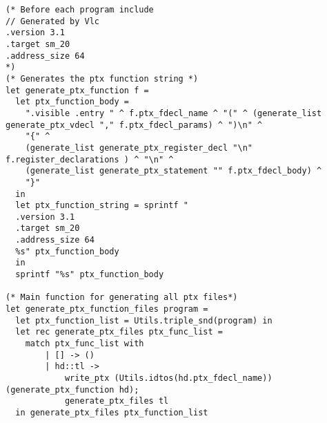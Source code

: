 \begin{verbatim}
(* Before each program include
// Generated by Vlc
.version 3.1
.target sm_20
.address_size 64
*)
(* Generates the ptx function string *)
let generate_ptx_function f =
  let ptx_function_body = 
    ".visible .entry " ^ f.ptx_fdecl_name ^ "(" ^ (generate_list generate_ptx_vdecl "," f.ptx_fdecl_params) ^ ")\n" ^ 
    "{" ^ 
    (generate_list generate_ptx_register_decl "\n" f.register_declarations ) ^ "\n" ^ 
    (generate_list generate_ptx_statement "" f.ptx_fdecl_body) ^ 
    "}"
  in
  let ptx_function_string = sprintf "
  .version 3.1
  .target sm_20
  .address_size 64
  %s" ptx_function_body 
  in 
  sprintf "%s" ptx_function_body

(* Main function for generating all ptx files*)
let generate_ptx_function_files program = 
  let ptx_function_list = Utils.triple_snd(program) in
  let rec generate_ptx_files ptx_func_list =
  	match ptx_func_list with
  		| [] -> ()
  		| hd::tl ->
  			write_ptx (Utils.idtos(hd.ptx_fdecl_name)) (generate_ptx_function hd);
  			generate_ptx_files tl
  in generate_ptx_files ptx_function_list\end{verbatim}	